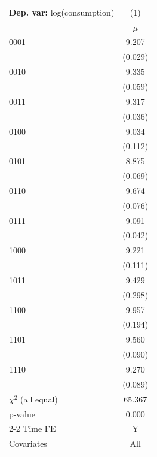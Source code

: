 \begin{tabular}{l c} \toprule  \textbf{Dep. var:}  log(consumption) 
                    &\multicolumn{1}{c}{(1)}         \\
                    &       $\mu$         \\
0001                &       9.207\sym{***}\\
                    &     (0.029)         \\
0010                &       9.335\sym{***}\\
                    &     (0.059)         \\
0011                &       9.317\sym{***}\\
                    &     (0.036)         \\
0100                &       9.034\sym{***}\\
                    &     (0.112)         \\
0101                &       8.875\sym{***}\\
                    &     (0.069)         \\
0110                &       9.674\sym{***}\\
                    &     (0.076)         \\
0111                &       9.091\sym{***}\\
                    &     (0.042)         \\
1000                &       9.221\sym{***}\\
                    &     (0.111)         \\
1011                &       9.429\sym{***}\\
                    &     (0.298)         \\
1100                &       9.957\sym{***}\\
                    &     (0.194)         \\
1101                &       9.560\sym{***}\\
                    &     (0.090)         \\
1110                &       9.270\sym{***}\\
                    &     (0.089)         \\
\addlinespace
$\chi^2$ (all equal)&      65.367         \\
p-value             &       0.000         \\
\cmidrule{2-2} Time FE & Y \\ Covariates & All \\ \bottomrule \end{tabular}
